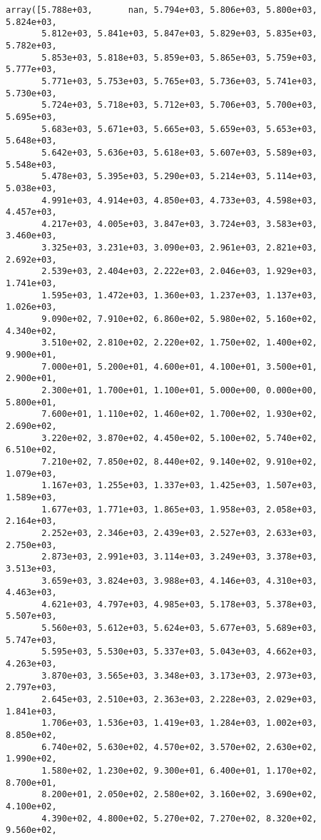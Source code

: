 \documentclass[11pt]{article}
\begin{document}
    \begin{verbatim}
array([5.788e+03,       nan, 5.794e+03, 5.806e+03, 5.800e+03, 5.824e+03,
       5.812e+03, 5.841e+03, 5.847e+03, 5.829e+03, 5.835e+03, 5.782e+03,
       5.853e+03, 5.818e+03, 5.859e+03, 5.865e+03, 5.759e+03, 5.777e+03,
       5.771e+03, 5.753e+03, 5.765e+03, 5.736e+03, 5.741e+03, 5.730e+03,
       5.724e+03, 5.718e+03, 5.712e+03, 5.706e+03, 5.700e+03, 5.695e+03,
       5.683e+03, 5.671e+03, 5.665e+03, 5.659e+03, 5.653e+03, 5.648e+03,
       5.642e+03, 5.636e+03, 5.618e+03, 5.607e+03, 5.589e+03, 5.548e+03,
       5.478e+03, 5.395e+03, 5.290e+03, 5.214e+03, 5.114e+03, 5.038e+03,
       4.991e+03, 4.914e+03, 4.850e+03, 4.733e+03, 4.598e+03, 4.457e+03,
       4.217e+03, 4.005e+03, 3.847e+03, 3.724e+03, 3.583e+03, 3.460e+03,
       3.325e+03, 3.231e+03, 3.090e+03, 2.961e+03, 2.821e+03, 2.692e+03,
       2.539e+03, 2.404e+03, 2.222e+03, 2.046e+03, 1.929e+03, 1.741e+03,
       1.595e+03, 1.472e+03, 1.360e+03, 1.237e+03, 1.137e+03, 1.026e+03,
       9.090e+02, 7.910e+02, 6.860e+02, 5.980e+02, 5.160e+02, 4.340e+02,
       3.510e+02, 2.810e+02, 2.220e+02, 1.750e+02, 1.400e+02, 9.900e+01,
       7.000e+01, 5.200e+01, 4.600e+01, 4.100e+01, 3.500e+01, 2.900e+01,
       2.300e+01, 1.700e+01, 1.100e+01, 5.000e+00, 0.000e+00, 5.800e+01,
       7.600e+01, 1.110e+02, 1.460e+02, 1.700e+02, 1.930e+02, 2.690e+02,
       3.220e+02, 3.870e+02, 4.450e+02, 5.100e+02, 5.740e+02, 6.510e+02,
       7.210e+02, 7.850e+02, 8.440e+02, 9.140e+02, 9.910e+02, 1.079e+03,
       1.167e+03, 1.255e+03, 1.337e+03, 1.425e+03, 1.507e+03, 1.589e+03,
       1.677e+03, 1.771e+03, 1.865e+03, 1.958e+03, 2.058e+03, 2.164e+03,
       2.252e+03, 2.346e+03, 2.439e+03, 2.527e+03, 2.633e+03, 2.750e+03,
       2.873e+03, 2.991e+03, 3.114e+03, 3.249e+03, 3.378e+03, 3.513e+03,
       3.659e+03, 3.824e+03, 3.988e+03, 4.146e+03, 4.310e+03, 4.463e+03,
       4.621e+03, 4.797e+03, 4.985e+03, 5.178e+03, 5.378e+03, 5.507e+03,
       5.560e+03, 5.612e+03, 5.624e+03, 5.677e+03, 5.689e+03, 5.747e+03,
       5.595e+03, 5.530e+03, 5.337e+03, 5.043e+03, 4.662e+03, 4.263e+03,
       3.870e+03, 3.565e+03, 3.348e+03, 3.173e+03, 2.973e+03, 2.797e+03,
       2.645e+03, 2.510e+03, 2.363e+03, 2.228e+03, 2.029e+03, 1.841e+03,
       1.706e+03, 1.536e+03, 1.419e+03, 1.284e+03, 1.002e+03, 8.850e+02,
       6.740e+02, 5.630e+02, 4.570e+02, 3.570e+02, 2.630e+02, 1.990e+02,
       1.580e+02, 1.230e+02, 9.300e+01, 6.400e+01, 1.170e+02, 8.700e+01,
       8.200e+01, 2.050e+02, 2.580e+02, 3.160e+02, 3.690e+02, 4.100e+02,
       4.390e+02, 4.800e+02, 5.270e+02, 7.270e+02, 8.320e+02, 9.560e+02,

\end{verbatim}
\end{document}
